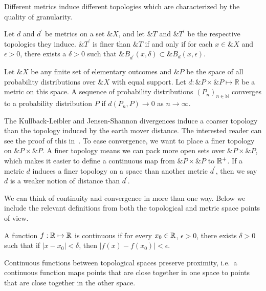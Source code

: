 Different metrics induce different topologies which are characterized by the
quality of granularity.

\begin{theorem}%
  \label{thm:granularity}
  Let $d$ and $d^\prime$ be metrics on a set $\&X$, and let $\&T$ and
  $\&T^\prime$ be the respective topologies they induce. $\&T^\prime$ is
  \textnormal{\sffamily finer} than $\&T$ if and only if for each $x \in \&X$
  and $\epsilon > 0$, there exists a $\delta > 0$ such that $\&B_{d^\prime}(x,
  \delta) \subset \&B_d(x, \epsilon)$.
\end{theorem}

\begin{definition}%
  \label{def:convergence-metric-space}
  Let $\&X$ be any finite set of elementary outcomes and $\&P$ be the space of
  all probability distributions over $\&X$ with equal support. Let $d: \&P
  \times \&P \mapsto \mathbb{R}$ be a metric on this space. A sequence of
  probability distributions ${(P_n)}_{n \in \mathbb{N}}$ \textnormal{\sffamily
    converges} to a probability distribution $P$ if $d(P_n,P) \to 0$ as $n \to
  \infty$.
\end{definition}

The Kullback-Leibler and Jensen-Shannon divergences induce a coarser topology
than the topology induced by the earth mover distance. The interested reader can
see the proof of this in~\cite{ref:arjovsky-2017}. To ease convergence, we want
to place a finer topology on $\&P \times \&P$. A finer topology means we can
pack more open sets over $\&P \times \&P$, which makes it easier to define a
continuous map from $\&P \times \&P$ to $\mathbb{R}^+$. If a metric $d$ induces a finer
topology on a space than another metric $d^\prime$, then we say $d$ is a weaker
notion of distance than $d^\prime$.

We can think of continuity and convergence in more than one way. Below we
include the relevant definitions from both the topological and metric space
points of view.

\begin{definition}%
  \label{def:continuity-metric-space}
  A function $f: \mathbb{R} \mapsto \mathbb{R}$ is \textnormal{\sffamily continuous} if for
  every $x_0 \in \mathbb{R}$, $\epsilon > 0$, there exists $\delta > 0$ such that if $|x
  - x_0| < \delta$, then $|f(x) - f(x_0)| < \epsilon$.
\end{definition}

Continuous functions between topological spaces preserve proximity, i.e.\ a
continuous function maps points that are close together in one space to points
that are close together in the other space.

